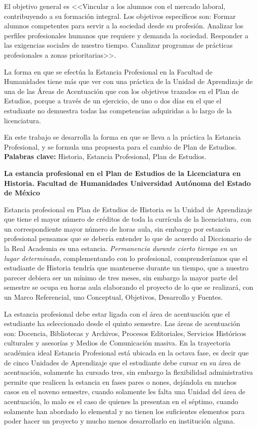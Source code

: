 El objetivo general es <<Vincular a los alumnos con el mercado laboral,
contribuyendo a su formación integral. Los objetivos específicos son:
Formar alumnos competentes para servir a la sociedad desde su profesión.
Analizar los perfiles profesionales humanos que requiere y demanda la
sociedad. Responder a las exigencias sociales de nuestro tiempo. Canalizar
programas de prácticas profesionales a zonas prioritarias>>.

La forma en que se efectúa la Estancia Profesional en la Facultad de
Humani\-dades tiene más que ver con una práctica de la Unidad de Aprendiza\-je de
una de las Áreas de Acentuación que con los objetivos trazados en el Plan
de Estudios, porque a través de un ejercicio, de uno o dos días en el que
el estudiante no demuestra todas las competencias adquiridas a lo largo de
la licenciatura.

En este trabajo se desarrolla la forma en que se lleva a la práctica la Estancia
Profesional, y se formula una propuesta para el cambio de Plan de Estudios.\\
\textbf{Palabras clave:} Historia, Estancia Profesional, Plan de Estudios.

\medskip
\textbf{La estancia profesional en el Plan de Estudios de la Licenciatura en
Historia. Facultad de Humanidades Universidad Autónoma del Estado de
México}


Estancia profesional en Plan de Estudios de Historia es la Unidad de
Aprendizaje que tiene el mayor número de créditos de toda la currícula de
la licenciatura, con un correspondiente mayor número de horas aula, sin
embargo por estancia profesional pensamos que se debería entender lo que de
acuerdo al Diccionario de la Real Academia es una estancia.
\textit{Permanencia durante cierto tiempo en un lugar determinado},
complementando con lo profesional, comprenderíamos que el estudiante de
Historia tendría que mantenerse durante un tiempo, que a nuestro parecer
debiera ser un mínimo de tres meses, sin embargo la mayor parte del
semestre se ocupa en horas aula elaborando el proyecto de lo que se
realizará, con un Marco Referencial, uno Conceptual, Objetivos, Desarrollo
y Fuentes.
\enlargethispage{1\baselineskip}

La estancia profesional debe estar ligada con el área de acentuación que el
estudiante ha seleccionado desde el quinto semestre. Las áreas de
acentuación son: Docencia, Bibliotecas y Archivos, Procesos Editoriales,
Servicios Históricos culturales y asesorías y Medios de Comunicación
masiva. En la trayectoria académica ideal Estancia Profesional está ubicada
en la octava fase, es decir que de cinco Unidades de Aprendizaje que el
estudiante debe cursar en su área de acentuación, solamente ha cursado
tres, sin embargo la flexibilidad administrativa permite que realicen la
estancia en fases pares o nones, dejándola en muchos casos en el noveno
semestre, cuando solamente les falta una Unidad del área de acentuación, lo
malo es el caso de quienes la presentan en el séptimo, cuando solamente han
abordado lo elemental y no tienen los suficientes elementos para poder
hacer un proyecto y mucho menos desarrollarlo en institución alguna. 


